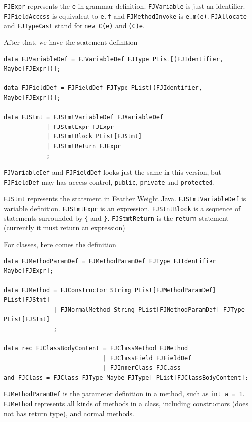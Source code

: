 \texttt{FJExpr} represents the \texttt{e} in grammar definition. \texttt{FJVariable} is just an identifier. \texttt{FJFieldAccess} is equivalent to \texttt{e.f} and \texttt{FJMethodInvoke} is \texttt{e.m(e)}. \texttt{FJAllocate} and \texttt{FJTypeCast} stand for \texttt{new C(e)} and \texttt{(C)e}.

After that, we have the statement definition

\begin{lstlisting}
data FJVariableDef = FJVariableDef FJType PList[(FJIdentifier, Maybe[FJExpr])];

data FJFieldDef = FJFieldDef FJType PList[(FJIdentifier, Maybe[FJExpr])];

data FJStmt = FJStmtVariableDef FJVariableDef
            | FJStmtExpr FJExpr
            | FJStmtBlock PList[FJStmt]
            | FJStmtReturn FJExpr
            ;
\end{lstlisting}

\texttt{FJVariableDef} and \texttt{FJFieldDef} looks just the same in this version, but \texttt{FJFieldDef} may has access control, \texttt{public}, \texttt{private} and \texttt{protected}.

\texttt{FJStmt} represents the statement in Feather Weight Java. \texttt{FJStmtVariableDef} is variable definition. \texttt{FJStmtExpr} is an expression. \texttt{FJStmtBlock} is a sequence of statements surrounded by \texttt{\{} and \texttt{\}}. \texttt{FJStmtReturn} is the \texttt{return} statement (currently it must return an expression).

For classes, here comes the definition

\begin{lstlisting}
data FJMethodParamDef = FJMethodParamDef FJType FJIdentifier Maybe[FJExpr];

data FJMethod = FJConstructor String PList[FJMethodParamDef] PList[FJStmt]
              | FJNormalMethod String PList[FJMethodParamDef] FJType PList[FJStmt]
              ;

data rec FJClassBodyContent = FJClassMethod FJMethod
                            | FJClassField FJFieldDef
                            | FJInnerClass FJClass
and FJClass = FJClass FJType Maybe[FJType] PList[FJClassBodyContent];
\end{lstlisting}

\texttt{FJMethodParamDef} is the parameter definition in a method, such as \texttt{int a = 1}. \texttt{FJMethod} represents all kinds of methods in a class, including constructors (does not has return type), and normal methods.

